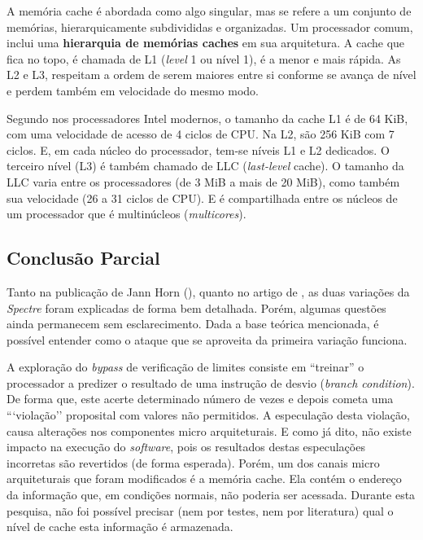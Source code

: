 \documentclass[
	article,			    %
	12pt,				    %
	oneside,			    %
	a4paper,			    %
	chapter=TITLE,		    %
	section=TITLE,		    %
	subsection=TITLE,	    %
	english,			    %
	brazil,				    %
	sumario=tradicional
]{abntex2}
\begin{document}
A memória cache é abordada como algo singular, mas se refere a um conjunto de memórias, hierarquicamente subdivididas e organizadas. Um processador comum, inclui uma \textbf{hierarquia de memórias caches} em sua arquitetura. A cache que fica no topo, é chamada de L1 (\emph{level} 1 ou nível 1), é a menor e mais rápida. As L2 e L3, respeitam a ordem de serem maiores entre si conforme se avança de nível e perdem também em velocidade do mesmo modo.

Segundo  nos processadores Intel modernos, o tamanho da cache L1 é de 64 KiB, com uma velocidade de acesso de 4 ciclos de CPU. Na L2, são 256 KiB com 7 ciclos. E, em cada núcleo do processador, tem-se níveis L1 e L2 dedicados. O terceiro nível (L3) é também chamado de LLC (\emph{last-level} cache). O tamanho da LLC varia entre os processadores (de 3 MiB a mais de 20 MiB), como também sua velocidade (26 a 31 ciclos de CPU). E é compartilhada entre os núcleos de um processador que é multinúcleos (\emph{multicores}).

\subsection{Conclusão Parcial}
Tanto na publicação de Jann Horn (\citeyear{Jann2018Reading}), quanto no artigo de , as duas variações da \emph{Spectre} foram explicadas de forma bem detalhada. Porém, algumas questões ainda permanecem sem esclarecimento. Dada a base teórica mencionada, é possível entender como o ataque que se aproveita da primeira variação funciona.

A exploração do \emph{bypass} de verificação de limites consiste em “treinar” o processador a predizer o resultado de uma instrução de desvio (\emph{branch condition}). De forma que, este acerte determinado número de vezes e depois cometa uma ```violação'' proposital com valores não permitidos. A especulação desta violação, causa alterações nos componentes micro arquiteturais. E como já dito, não existe impacto na execução do \emph{software}, pois os resultados destas especulações incorretas são revertidos (de forma esperada). Porém, um dos canais micro arquiteturais que foram modificados é a memória cache. Ela contém o endereço da informação que, em condições normais, não poderia ser acessada. Durante esta pesquisa, não foi possível precisar (nem por testes, nem por literatura) qual o nível de cache esta informação é armazenada.
\end{document}
